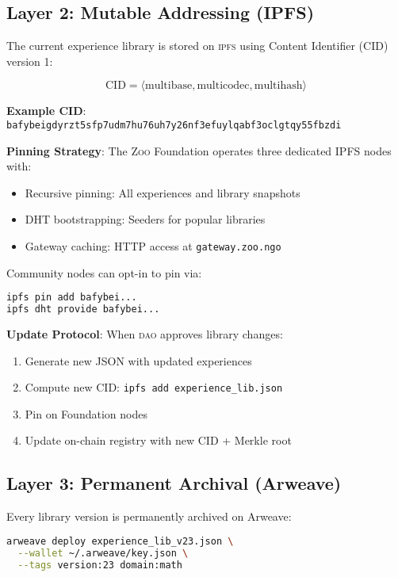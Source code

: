 \documentclass[11pt,letterpaper]{article}
\newcommand{\Zoo}{\textsc{Zoo}}
\newcommand{\DAO}{\textsc{dao}}
\newcommand{\IPFS}{\textsc{ipfs}}
\begin{document}
\subsection{Layer 2: Mutable Addressing (IPFS)}

The current experience library is stored on \IPFS{} using Content Identifier (CID) version 1:

\begin{equation}
\text{CID} = \langle \text{multibase}, \text{multicodec}, \text{multihash} \rangle
\end{equation}

\textbf{Example CID}: \texttt{bafybeigdyrzt5sfp7udm7hu76uh7y26nf3efuylqabf3oclgtqy55fbzdi}

\textbf{Pinning Strategy}: The \Zoo{} Foundation operates three dedicated IPFS nodes with:
\begin{itemize}
    \item Recursive pinning: All experiences and library snapshots
    \item DHT bootstrapping: Seeders for popular libraries
    \item Gateway caching: HTTP access at \texttt{gateway.zoo.ngo}
\end{itemize}

Community nodes can opt-in to pin via:
\begin{lstlisting}[language=bash]
ipfs pin add bafybei...
ipfs dht provide bafybei...
\end{lstlisting}

\textbf{Update Protocol}: When \DAO{} approves library changes:
\begin{enumerate}
    \item Generate new JSON with updated experiences
    \item Compute new CID: \texttt{ipfs add experience\_lib.json}
    \item Pin on Foundation nodes
    \item Update on-chain registry with new CID + Merkle root
\end{enumerate}

\subsection{Layer 3: Permanent Archival (Arweave)}

Every library version is permanently archived on Arweave:

\begin{lstlisting}[language=bash]
arweave deploy experience_lib_v23.json \
  --wallet ~/.arweave/key.json \
  --tags version:23 domain:math
\end{lstlisting}
\end{document}
